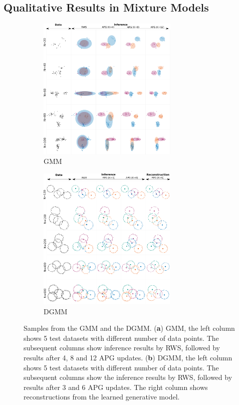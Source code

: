 \documentclass[anonymous=false, %
               format=acmsmall, %
               review=true, %
               screen=true, %
               nonacm=true]{acmart}
\theoremstyle{definition}
\begin{document}
\newpage
\subsection{Qualitative Results in Mixture Models}
\label{appendix:samples-mixture}
\begin{figure}[!h]
  \centering
  \begin{subfigure}[t]{0.5\textwidth}
  \includegraphics[width=67mm]{figures/gmm_samples.pdf}
  \vspace*{-1mm}
  \caption{GMM}
  \vspace{-1ex}
  \end{subfigure}%
  \begin{subfigure}[t]{0.5\textwidth}
  \includegraphics[width=67mm]{figures/dgmm_samples.pdf}
  \vspace*{-1mm}
  \caption{DGMM}
  \vspace{-1ex}
  \end{subfigure}
  \caption{Samples from the GMM and the DGMM. (\textbf{a}) GMM, the left column shows 5 test datasets with different number of data points. The subsequent columns show inference results by RWS, followed by results after 4, 8 and 12 APG updates. (\textbf{b}) DGMM, the left column shows 5 test datasets with different number of data points. The subsequent columns show the inference results by RWS, followed by results after 3 and 6 APG updates. The right column shows reconstructions from the learned generative model.}
  \label{samples-mixture}
\end{figure}
\end{document}
